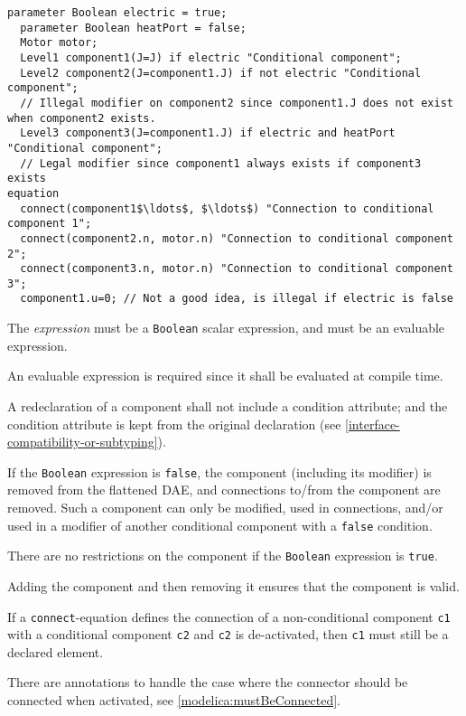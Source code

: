 \begin{example}
\begin{lstlisting}[language=modelica]
  parameter Boolean electric = true;
  parameter Boolean heatPort = false;
  Motor motor;
  Level1 component1(J=J) if electric "Conditional component";
  Level2 component2(J=component1.J) if not electric "Conditional component";
  // Illegal modifier on component2 since component1.J does not exist when component2 exists.
  Level3 component3(J=component1.J) if electric and heatPort "Conditional component";
  // Legal modifier since component1 always exists if component3 exists
equation
  connect(component1$\ldots$, $\ldots$) "Connection to conditional component 1";
  connect(component2.n, motor.n) "Connection to conditional component 2";
  connect(component3.n, motor.n) "Connection to conditional component 3";
  component1.u=0; // Not a good idea, is illegal if electric is false
\end{lstlisting}
\end{example}

The \emph{expression} must be a \lstinline!Boolean! scalar expression, and must be an evaluable expression.

\begin{nonnormative}
An evaluable expression is required since it shall be evaluated at compile time.
\end{nonnormative}

A redeclaration of a component shall not include a condition attribute; and the condition attribute is kept from the original declaration (see
\cref{interface-compatibility-or-subtyping}).

If the \lstinline!Boolean! expression is \lstinline!false!, the component (including its modifier) is removed from the flattened DAE, and connections to/from the component are removed.
Such a component can only be modified, used in connections, and/or used in a modifier of another conditional component with a \lstinline!false! condition.

There are no restrictions on the component if the \lstinline!Boolean! expression is \lstinline!true!.

\begin{nonnormative}
Adding the component and then removing it ensures that the component is valid.

If a \lstinline!connect!-equation defines the connection of a non-conditional component \lstinline!c1! with a conditional component \lstinline!c2! and \lstinline!c2! is de-activated, then \lstinline!c1! must still be a declared element.

There are annotations to handle the case where the connector should be connected when activated, see \cref{modelica:mustBeConnected}.
\end{nonnormative}


